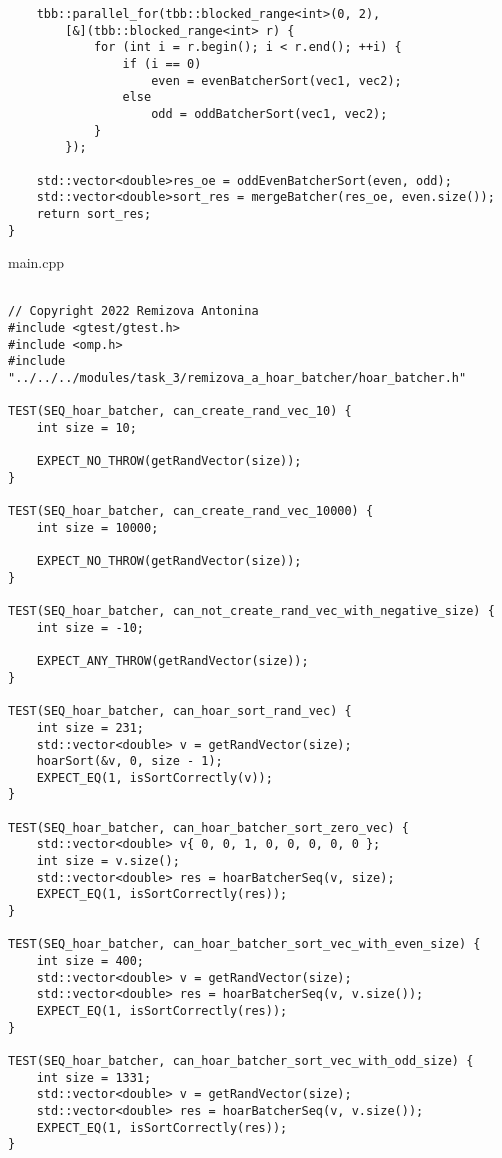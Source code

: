 \documentclass{report}
\begin{document}
\begin{lstlisting}
    tbb::parallel_for(tbb::blocked_range<int>(0, 2),
        [&](tbb::blocked_range<int> r) {
            for (int i = r.begin(); i < r.end(); ++i) {
                if (i == 0)
                    even = evenBatcherSort(vec1, vec2);
                else
                    odd = oddBatcherSort(vec1, vec2);
            }
        });

    std::vector<double>res_oe = oddEvenBatcherSort(even, odd);
    std::vector<double>sort_res = mergeBatcher(res_oe, even.size());
    return sort_res;
}

\end{lstlisting}
\par main.cpp
\begin{lstlisting}

// Copyright 2022 Remizova Antonina
#include <gtest/gtest.h>
#include <omp.h>
#include "../../../modules/task_3/remizova_a_hoar_batcher/hoar_batcher.h"

TEST(SEQ_hoar_batcher, can_create_rand_vec_10) {
    int size = 10;

    EXPECT_NO_THROW(getRandVector(size));
}

TEST(SEQ_hoar_batcher, can_create_rand_vec_10000) {
    int size = 10000;

    EXPECT_NO_THROW(getRandVector(size));
}

TEST(SEQ_hoar_batcher, can_not_create_rand_vec_with_negative_size) {
    int size = -10;

    EXPECT_ANY_THROW(getRandVector(size));
}

TEST(SEQ_hoar_batcher, can_hoar_sort_rand_vec) {
    int size = 231;
    std::vector<double> v = getRandVector(size);
    hoarSort(&v, 0, size - 1);
    EXPECT_EQ(1, isSortCorrectly(v));
}

TEST(SEQ_hoar_batcher, can_hoar_batcher_sort_zero_vec) {
    std::vector<double> v{ 0, 0, 1, 0, 0, 0, 0, 0 };
    int size = v.size();
    std::vector<double> res = hoarBatcherSeq(v, size);
    EXPECT_EQ(1, isSortCorrectly(res));
}

TEST(SEQ_hoar_batcher, can_hoar_batcher_sort_vec_with_even_size) {
    int size = 400;
    std::vector<double> v = getRandVector(size);
    std::vector<double> res = hoarBatcherSeq(v, v.size());
    EXPECT_EQ(1, isSortCorrectly(res));
}

TEST(SEQ_hoar_batcher, can_hoar_batcher_sort_vec_with_odd_size) {
    int size = 1331;
    std::vector<double> v = getRandVector(size);
    std::vector<double> res = hoarBatcherSeq(v, v.size());
    EXPECT_EQ(1, isSortCorrectly(res));
}


\end{lstlisting}
\end{document}
